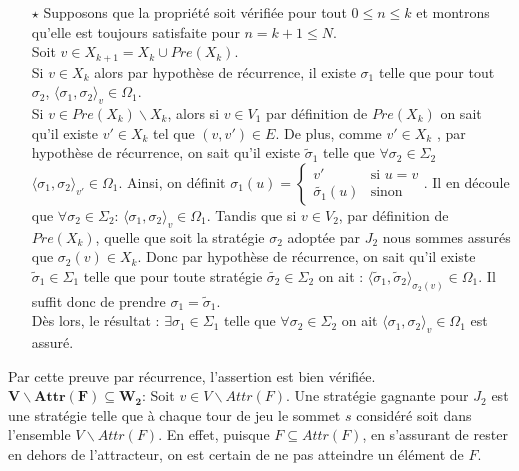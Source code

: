 \begin{demonstration}
\begin{enumerate}
			\item[$\star$] Supposons que la propriété soit vérifiée pour tout $ 0 \leq n \leq k $ et montrons qu'elle est toujours satisfaite pour $n = k + 1 \leq N$. \\
			Soit $v \in X_{k+1} = X_{k} \cup Pre(X_{k})$. \\
			Si $v \in X_{k}$ alors par hypothèse de récurrence, il existe $\sigma _{1}$ telle que pour tout $\sigma_2$, $ \langle \sigma _{1},\sigma _{2} \rangle_v \in \Omega _{1}$.\\
			Si $v \in Pre(X_{k})\backslash X_k$, alors si $v \in V_{1}$ par définition de $Pre(X_{k})$ on sait qu'il existe $v'\in X_{k}$ tel que $(v,v')\in E$. De plus, comme $v' \in X_k$ , par hypothèse de récurrence, on sait qu'il existe $\tilde{\sigma}_1$ telle que $\forall \sigma_2 \in \Sigma_2$ $\langle \sigma_1, \sigma_2 \rangle_{v'} \in \Omega_1$. Ainsi, on définit $\sigma _{1}(u) =\begin{cases} v' & \text{si } u = v \\ \tilde{\sigma_1}(u) & \text{sinon} \end{cases}$. Il en découle que $\forall \sigma_2 \in \Sigma_2$: $\langle \sigma_1, \sigma_2 \rangle_v \in \Omega_1$.
			 Tandis que si $v \in V_{2}$, par définition de $Pre(X_k)$, quelle que soit la stratégie $\sigma _{2}$ adoptée par $J_{2}$  nous sommes assurés que $\sigma _{2}(v) \in X_{k}$. Donc par hypothèse de récurrence, on sait qu'il existe $\tilde{\sigma}_1 \in \Sigma_1$ telle que pour toute stratégie $\tilde{\sigma_2} \in \Sigma_2$ on ait : $\langle \tilde{\sigma}_1, \tilde{\sigma}_2 \rangle_{\sigma_2(v)} \in \Omega_1$. Il suffit donc de prendre $\sigma_1  = \tilde{\sigma}_1$.\\
			
			 Dès lors, le résultat : $\exists \sigma_1 \in \Sigma_1$ telle que $\forall \sigma_2 \in \Sigma_2$ on ait \linebreak $ \langle \sigma _{1},\sigma _{2} \rangle_v \in \Omega _{1}$ est assuré.
		\end{enumerate}
		Par cette preuve par récurrence, l'assertion est bien vérifiée.\\
		
		\noindent$\mathbf{V \backslash Attr(F) \subseteq W_{2}}$: Soit $v \in V \backslash Attr(F)$. Une stratégie gagnante pour $J_{2}$ est une stratégie telle que à chaque tour de jeu le sommet $s$ considéré soit dans l'ensemble $V\backslash Attr(F)$. En effet, puisque $F \subseteq Attr(F)$, en s'assurant de rester en dehors de l'attracteur, on est certain de ne pas atteindre un élément de $F$.\\
		

\end{demonstration}

